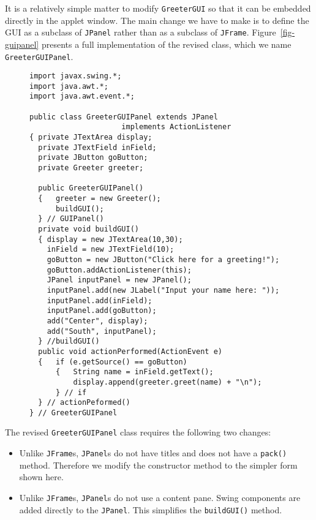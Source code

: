 
It is a relatively simple matter to modify {\tt GreeterGUI} so that it
can be embedded directly in the applet window. The main change we have
to make is to define the GUI as a subclass of {\tt JPanel} rather than
as a subclass of {\tt JFrame}.  Figure~\ref{fig-guipanel} presents a full
implementation of the revised class, which we name {\tt GreeterGUIPanel}.

\begin{figure}[htb]
\jjjprogstart
\begin{jjjlisting}
\begin{lstlisting}
import javax.swing.*;
import java.awt.*;
import java.awt.event.*;

public class GreeterGUIPanel extends JPanel 
                     implements ActionListener 
{ private JTextArea display;
  private JTextField inField;
  private JButton goButton;
  private Greeter greeter;
	    
  public GreeterGUIPanel() 
  {   greeter = new Greeter();  
      buildGUI();
  } // GUIPanel()
  private void buildGUI() 
  { display = new JTextArea(10,30);
    inField = new JTextField(10);
    goButton = new JButton("Click here for a greeting!");
    goButton.addActionListener(this);
    JPanel inputPanel = new JPanel();
    inputPanel.add(new JLabel("Input your name here: "));
    inputPanel.add(inField);
    inputPanel.add(goButton);
    add("Center", display);
    add("South", inputPanel);
  } //buildGUI()
  public void actionPerformed(ActionEvent e) 
  {   if (e.getSource() == goButton) 
      {   String name = inField.getText();
          display.append(greeter.greet(name) + "\n");
      } // if
  } // actionPeformed()
} // GreeterGUIPanel
\end{lstlisting}
\end{jjjlisting}
\end{figure}

The revised {\tt GreeterGUIPanel} class requires the following two
changes:

\begin{itemize}
\item Unlike {\tt JFrame}s, {\tt JPanel}s do not have titles and does not have 
a {\tt pack()}  method. Therefore we modify the constructor
method to the simpler form shown here.

\item Unlike {\tt JFrame}s, {\tt JPanel}s do not use a content pane. Swing
components are added directly to the {\tt JPanel}. This simplifies the
{\tt buildGUI()} method. 

\end{itemize}

